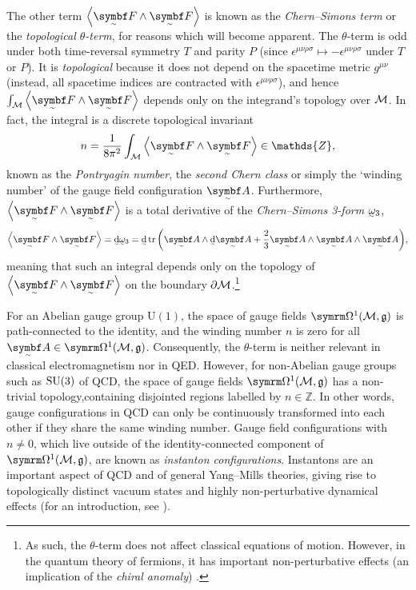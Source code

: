 The other term $\angbr{\tsbm F \wedge \tsbm F}$ is known as the \emph{Chern--Simons term} or the \emph{topological $θ$-term}, for reasons which will become apparent.
The $θ$-term is odd under both time-reversal symmetry $T$ and parity $P$ (since $\epsilon^{μν\rho\sigma} \mapsto -\epsilon^{μν\rho\sigma}$ under $T$ or $P$).
It is \emph{topological} because it does not depend on the spacetime metric $g^{μν}$ (instead, all spacetime indices are contracted with $\epsilon^{μν\rho\sigma}$), and hence $\int_{\cal M} \angbr{\tsbm F \wedge \tsbm F}$ depends only on the integrand's topology over $\cal M$.
In fact, the integral is a discrete topological invariant
\begin{align}
	n = \frac{1}{8\pi^2}\int_{\cal M} \angbr{\tsbm F \wedge \tsbm F} \in \mathds{Z}
,\end{align}
known as the \emph{Pontryagin number}, the \emph{second Chern class} \cite[§\,1]{Witten_1989} or simply the `winding number' \cite[§\,2.2]{Tong_lecture_notes} of the gauge field configuration $\tsbm A$.
Furthermore, $\angbr{\tsbm F \wedge \tsbm F}$ is a total derivative of the \emph{Chern--Simons 3-form} $\csform$,
\begin{align}
	\angbr{\tsbm F \wedge \tsbm F}
	= \ts\dd\csform
	= \ts\dd\tr\qty(\tsbm A\wedge\ts\dd\tsbm A + \frac{2}{3}\tsbm A\wedge\tsbm A\wedge\tsbm A)
,\end{align}
meaning that such an integral depends only on the topology of $\angbr{\tsbm F \wedge \tsbm F}$ on the boundary $\partial\cal M$.\footnote{
	As such, the $θ$-term does not affect classical equations of motion.
	However, in the quantum theory of fermions, it has important non-perturbative effects (an implication of the \emph{chiral anomaly}) \cite[§\,3]{Tong_lecture_notes}.
}


For an Abelian gauge group $\mathrm{U}(1)$, the space of gauge fields $\forms^1(\cal M, \mathfrak g)$ is path-connected to the identity, and the winding number $n$ is zero for all $\tsbm A \in \forms^1(\cal M, \mathfrak g)$.
Consequently, the $θ$-term is neither relevant in classical electromagnetism nor in QED.
However, for non-Abelian gauge groups such as $\SU(3)$ of QCD, the space of gauge fields $\forms^1(\cal M, \mathfrak g)$ has a non-trivial topology,\footnotemark containing disjointed regions labelled by $n \in \mathds{Z}$.
In other words, gauge configurations in QCD can only be continuously transformed into each other if they share the same winding number.
Gauge field configurations with $n \ne 0$, which live outside of the identity-connected component of $\forms^1(\cal M, \mathfrak g)$, are known as \emph{instanton configurations}.
Instantons are an important aspect of QCD and of general Yang--Mills theories, giving rise to topologically distinct vacuum states and highly non-perturbative dynamical effects (for an introduction, see \cite{Tong_lecture_notes,lectures-on-instantons,instantons-whats-happening}).




